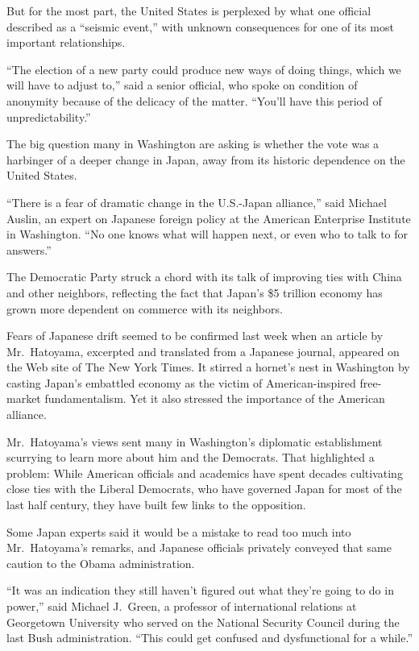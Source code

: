 ﻿\documentclass[12pt]{article}
\begin{document}
But for the most part, the United States is perplexed\cite{perplexed} by what one official described
as a ``seismic\cite{seismic} event,'' with unknown consequences for one of its most important
relationships.

``The election of a new party could produce new ways of doing things, which we will have to adjust
to,'' said a senior official, who spoke on condition of anonymity because of the delicacy of the
matter. ``You'll have this period of unpredictability.''

The big question many in Washington are asking is whether the vote was a harbinger\cite{harbinger}
of a deeper change in Japan, away from its historic dependence on the United States.

``There is a fear of dramatic change in the U.S.-Japan alliance,'' said Michael Auslin, an expert on
Japanese foreign policy at the American Enterprise Institute in Washington. ``No one knows what will
happen next, or even who to talk to for answers.''

The Democratic Party struck a chord with its talk of improving ties with China and other neighbors,
reflecting the fact that Japan's \$5 trillion economy has grown more dependent on commerce with its
neighbors.

Fears of Japanese drift seemed to be confirmed last week when an article by Mr.~Hatoyama, excerpted
and translated from a Japanese journal, appeared on the Web site of The New York Times. It stirred a
hornet's nest in Washington by casting Japan's embattled economy as the victim of American-inspired
free-market fundamentalism. Yet it also stressed the importance of the American alliance.

Mr.~Hatoyama's views sent many in Washington's diplomatic establishment scurrying\cite{scurry} to
learn more about him and the Democrats. That highlighted a problem: While American officials and
academics have spent decades cultivating close ties with the Liberal Democrats, who have governed
Japan for most of the last half century, they have built few links to the opposition.

Some Japan experts said it would be a mistake to read too much into Mr.~Hatoyama's remarks, and
Japanese officials privately conveyed that same caution to the Obama administration.

``It was an indication they still haven't figured out what they're going to do in power,'' said
Michael J.~Green, a professor of international relations at Georgetown University who served on the
National Security Council during the last Bush administration. ``This could get confused and
dysfunctional for a while.''
\end{document}
